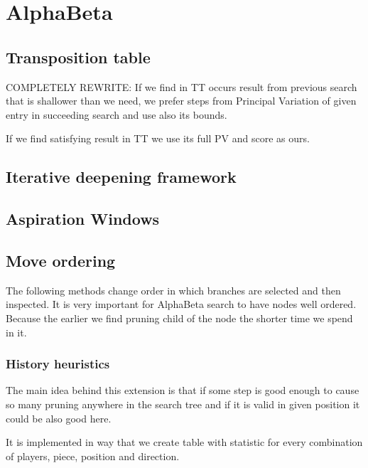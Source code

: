 \documentclass[12pt,titlepage,fleqn]{report}
\begin{document}
\section{AlphaBeta}
\subsection{Transposition table}
COMPLETELY REWRITE: If we find in TT occurs result from previous search that is
shallower than we need, we prefer steps from Principal Variation of given entry
in succeeding search and use also its bounds.

If we find satisfying result in TT we use its full PV and score as ours.

\subsection{Iterative deepening framework}
\subsection{Aspiration Windows}
\subsection{Move ordering}
The following methods change order in which branches are selected and then
inspected. It is very important for AlphaBeta search to have nodes well
ordered. Because the earlier we find pruning child of the node the shorter time
we spend in it.
	\subsubsection{History heuristics}
	The main idea behind this extension is that if some step is good enough
	to cause so many pruning anywhere in the search tree and if it is valid in
	given position it could be also good here.

	It is implemented in way that we create table with statistic for every
	combination of players, piece, position and direction.
\end{document}
